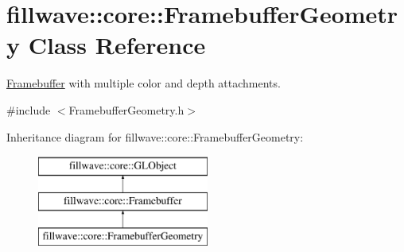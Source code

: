 \hypertarget{classfillwave_1_1core_1_1FramebufferGeometry}{}\section{fillwave\+:\+:core\+:\+:Framebuffer\+Geometry Class Reference}
\label{classfillwave_1_1core_1_1FramebufferGeometry}


\hyperlink{classfillwave_1_1core_1_1Framebuffer}{Framebuffer} with multiple color and depth attachments.  




{\ttfamily \#include $<$Framebuffer\+Geometry.\+h$>$}

Inheritance diagram for fillwave\+:\+:core\+:\+:Framebuffer\+Geometry\+:\begin{figure}[H]
\begin{center}
\leavevmode
\includegraphics[height=3.000000cm]{classfillwave_1_1core_1_1FramebufferGeometry}
\end{center}
\end{figure}
